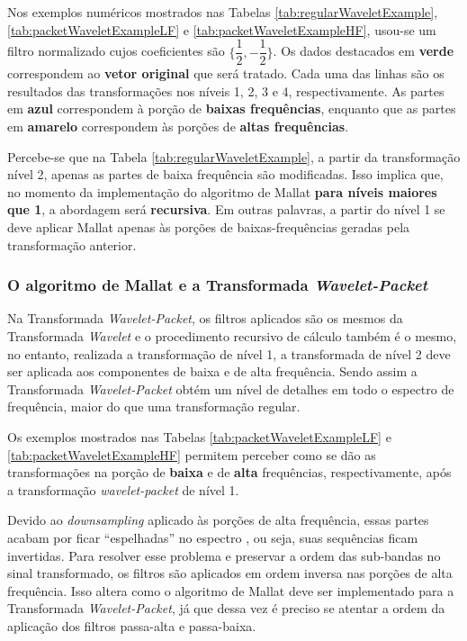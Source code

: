 			\par Nos exemplos numéricos mostrados nas Tabelas \ref{tab:regularWaveletExample}, \ref{tab:packetWaveletExampleLF} e \ref{tab:packetWaveletExampleHF}, usou-se um filtro normalizado cujos coeficientes são $\{\dfrac{1}{2},-\dfrac{1}{2}\}$. Os dados destacados em \textbf{verde} correspondem ao \textbf{vetor original} que será tratado. Cada uma das linhas são os resultados das transformações nos níveis 1, 2, 3 e 4, respectivamente. As partes em \textbf{azul} correspondem à porção de \textbf{baixas frequências}, enquanto que as partes em \textbf{amarelo} correspondem às porções de \textbf{altas frequências}.
			
			\par Percebe-se que na Tabela \ref{tab:regularWaveletExample}, a partir da transformação nível 2, apenas as partes de baixa frequência são modificadas. Isso implica que, no momento da implementação do algoritmo de Mallat \textbf{para níveis maiores que 1}, a abordagem será \textbf{recursiva}. Em outras palavras, a partir do nível 1 se deve aplicar Mallat apenas às porções de baixas-frequências geradas pela transformação anterior.
			
			

		\subsubsection{O algoritmo de Mallat e a Transformada \textit{Wavelet-Packet}}
			\par Na Transformada \textit{Wavelet-Packet}, os filtros aplicados são os mesmos da Transformada \textit{Wavelet} e o procedimento recursivo de cálculo também é o mesmo, no entanto, realizada a transformação de nível 1, a transformada de nível 2 deve ser aplicada aos componentes de baixa e de alta frequência. Sendo assim a Transformada \textit{Wavelet-Packet} obtém um nível de detalhes em todo o espectro de frequência, maior do que uma transformação regular. 
			
			\par Os exemplos mostrados nas Tabelas \ref{tab:packetWaveletExampleLF} e \ref{tab:packetWaveletExampleHF} permitem perceber como se dão as transformações na porção de \textbf{baixa} e de \textbf{alta} frequências, respectivamente, após a transformação \textit{wavelet-packet} de nível 1.

			\par Devido ao \textit{downsampling} aplicado às porções de alta frequência, essas partes acabam por ficar ``espelhadas'' no espectro \cite{Jensen_2001}, ou seja, suas sequências ficam invertidas. Para resolver esse problema e preservar a ordem das sub-bandas no sinal transformado, os filtros são aplicados em ordem inversa nas porções de alta frequência. Isso altera como o algoritmo de Mallat deve ser implementado para a Transformada \textit{Wavelet-Packet}, já que dessa vez é preciso se atentar a ordem da aplicação dos filtros passa-alta e passa-baixa.

